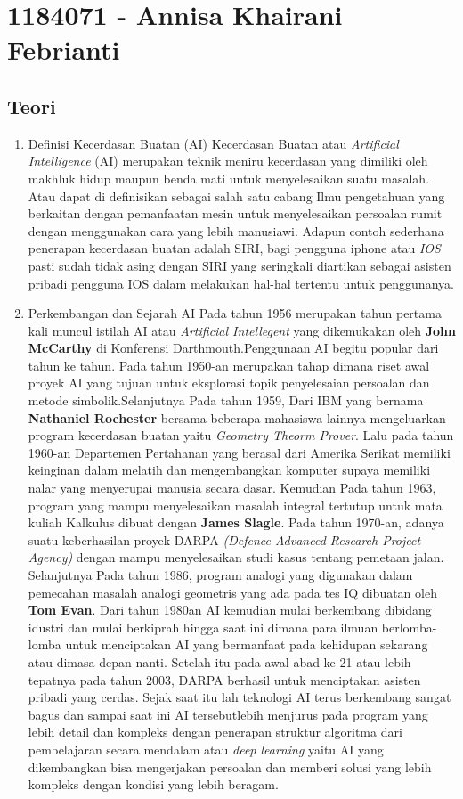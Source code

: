 \section{1184071 - Annisa Khairani Febrianti}
\subsection{Teori}
\begin{enumerate}
	\item Definisi Kecerdasan Buatan (AI)
	\hfill\break
	Kecerdasan Buatan atau \textit{Artificial Intelligence} (AI) merupakan teknik meniru kecerdasan yang dimiliki oleh makhluk hidup maupun benda mati untuk menyelesaikan suatu masalah. Atau dapat di definisikan sebagai salah satu cabang Ilmu pengetahuan yang berkaitan dengan pemanfaatan mesin untuk menyelesaikan persoalan rumit dengan menggunakan cara yang lebih manusiawi. Adapun contoh sederhana penerapan kecerdasan buatan adalah SIRI, bagi pengguna iphone atau \textit{IOS} pasti sudah tidak asing dengan SIRI yang
    seringkali diartikan sebagai asisten pribadi pengguna IOS dalam melakukan hal-hal tertentu untuk penggunanya.

	\item Perkembangan dan Sejarah AI
	\hfill\break
	Pada tahun 1956 merupakan tahun pertama kali muncul istilah AI atau \textit{Artificial Intellegent} yang dikemukakan oleh \textbf{John McCarthy} di Konferensi Darthmouth.Penggunaan AI begitu popular dari tahun ke tahun. Pada tahun 1950-an merupakan tahap dimana riset awal proyek AI yang tujuan untuk eksplorasi topik penyelesaian persoalan dan metode simbolik.Selanjutnya Pada tahun 1959, Dari IBM yang bernama \textbf{Nathaniel Rochester} bersama beberapa mahasiswa lainnya mengeluarkan program kecerdasan buatan yaitu \textit{Geometry Theorm Prover}. Lalu pada tahun 1960-an Departemen Pertahanan yang berasal dari Amerika Serikat memiliki keinginan dalam melatih dan mengembangkan komputer supaya memiliki nalar yang menyerupai manusia secara dasar. Kemudian Pada tahun 1963, program yang mampu menyelesaikan masalah integral tertutup untuk mata kuliah Kalkulus dibuat dengan \textbf{James Slagle}. Pada tahun 1970-an, adanya suatu keberhasilan proyek DARPA \textit{(Defence Advanced Research Project Agency)} dengan mampu menyelesaikan studi kasus tentang pemetaan jalan. Selanjutnya Pada tahun 1986, program analogi yang digunakan dalam pemecahan masalah analogi geometris yang ada pada tes IQ dibuatan oleh \textbf{Tom Evan}. Dari tahun 1980an AI kemudian mulai berkembang dibidang idustri dan mulai berkiprah hingga saat ini dimana para ilmuan berlomba-lomba untuk menciptakan AI yang bermanfaat pada kehidupan sekarang atau dimasa depan nanti. Setelah itu pada awal abad ke 21 atau lebih tepatnya pada tahun 2003, DARPA berhasil untuk menciptakan asisten pribadi yang cerdas. Sejak saat itu lah teknologi AI terus berkembang sangat bagus dan sampai saat ini AI tersebutlebih menjurus pada program yang lebih detail dan kompleks dengan penerapan struktur algoritma dari pembelajaran secara mendalam atau \textit{deep learning} yaitu AI yang dikembangkan bisa mengerjakan persoalan dan memberi solusi yang lebih kompleks dengan kondisi yang lebih beragam.


\end{enumerate}
